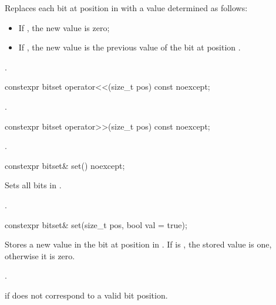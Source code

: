 \begin{itemdescr}
\pnum
\effects
Replaces each bit at position  in
with a value determined as follows:

\begin{itemize}
\item
If , the new value is zero;
\item
If , the new value is the previous value of the bit at position .
\end{itemize}

\pnum
\returns
{}.
\end{itemdescr}

%
\begin{itemdecl}
constexpr bitset operator<<(size_t pos) const noexcept;
\end{itemdecl}

\begin{itemdescr}
\pnum
\returns
{}.
\end{itemdescr}

%
\begin{itemdecl}
constexpr bitset operator>>(size_t pos) const noexcept;
\end{itemdecl}

\begin{itemdescr}
\pnum
\returns
{}.
\end{itemdescr}

%
%
\begin{itemdecl}
constexpr bitset& set() noexcept;
\end{itemdecl}

\begin{itemdescr}
\pnum
\effects
Sets all bits in
.

\pnum
\returns
{}.
\end{itemdescr}

%
%
\begin{itemdecl}
constexpr bitset& set(size_t pos, bool val = true);
\end{itemdecl}

\begin{itemdescr}
\pnum
\effects
Stores a new value in the bit at position  in
.
If  is , the stored value is one, otherwise it is zero.

\pnum
\returns
{}.

\pnum
\throws
{}%
 if  does not correspond to a valid bit position.
\end{itemdescr}

